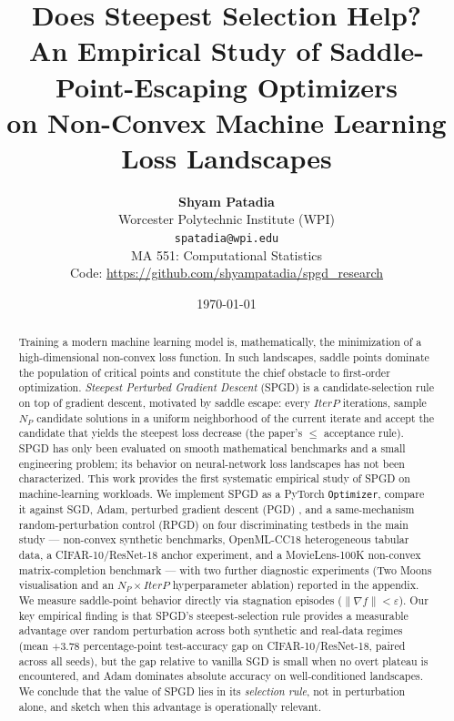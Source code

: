 \documentclass[11pt]{article}
\title{\bfseries \LARGE Does Steepest Selection Help?\\
       An Empirical Study of Saddle-Point-Escaping Optimizers\\
       on Non-Convex Machine Learning Loss Landscapes}
\author{%
  \textbf{Shyam Patadia}\\
  Worcester Polytechnic Institute (WPI)\\
  \texttt{spatadia@wpi.edu}\\[2pt]
  \small MA 551: Computational Statistics\\[2pt]
  \small Code: \url{https://github.com/shyampatadia/spgd_research}
}
\date{\today}
\newcommand{\np}{\ensuremath{N_P}}
\newcommand{\iterp}{\ensuremath{\textit{IterP}}}
\begin{document}
\maketitle
\thispagestyle{empty}

\begin{abstract}
\noindent
Training a modern machine learning model is, mathematically, the
minimization of a high-dimensional non-convex loss function. In such
landscapes, saddle points dominate the population of critical points and
constitute the chief obstacle to first-order optimization. \emph{Steepest
Perturbed Gradient Descent} (SPGD) \citep{vahedi2024spgd} is a
candidate-selection rule on top of gradient descent, motivated by
saddle escape: every \iterp{} iterations, sample \np{} candidate
solutions in a uniform neighborhood of the current iterate and accept
the candidate that yields the steepest loss decrease (the paper's
$\leq$ acceptance rule). SPGD has only been
evaluated on smooth mathematical benchmarks and a small engineering
problem; its behavior on neural-network loss landscapes has not been
characterized. This work provides the first systematic empirical study
of SPGD on machine-learning workloads. We implement SPGD as a PyTorch
\verb|Optimizer|, compare it against SGD, Adam, perturbed gradient
descent (PGD) \citep{jin2017escape}, and a same-mechanism
random-perturbation control (RPGD) on four discriminating testbeds
in the main study --- non-convex synthetic benchmarks, OpenML-CC18
heterogeneous tabular data, a CIFAR-10/ResNet-18 anchor experiment,
and a MovieLens-100K non-convex matrix-completion benchmark --- with
two further diagnostic experiments (Two Moons visualisation and an
$\np \times \iterp$ hyperparameter ablation) reported in the
appendix. We measure
saddle-point behavior directly via stagnation episodes
($\|\nabla f\| < \varepsilon$). Our key empirical finding is that
SPGD's steepest-selection rule provides a measurable advantage over
random perturbation across both synthetic and real-data regimes (mean
$+3.78$ percentage-point test-accuracy gap on CIFAR-10/ResNet-18,
paired across all seeds), but the gap relative to vanilla SGD is small
when no overt plateau is encountered, and Adam dominates absolute
accuracy on well-conditioned landscapes. We conclude that the value of
SPGD lies in its \emph{selection rule}, not in perturbation alone, and
sketch when this advantage is operationally relevant.
\end{abstract}
\end{document}
